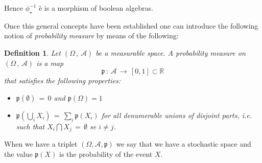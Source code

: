 \documentclass[10pt,a4paper]{article}
\newtheorem{definizione}{Definition}[section]
\begin{document}
Hence $\phi_\star^{-1}$ \`{e} is a morphism of boolean algebras.
\par
Once this general concepts have been established one can introduce the following  notion of
\textit{probability measure} by means of the following:
\begin{definizione}
\label{misaproba} Let $\left(\Omega\, , \, \mathcal{A}\right)$ be a measurable space. A probability measure on $\left(\Omega\,
, \, \mathcal{A}\right)$ is a map
\begin{equation}\label{cuccusprobrpus}
    \mathfrak{p} \, : \, \mathcal{A} \, \rightarrow \, [0,1] \subset \mathbb{R}
\end{equation}
that satisfies the following properties:
\begin{itemize}
  \item $\mathfrak{p}(\emptyset) \, = \, 0$ and $\mathfrak{p}(\Omega)=1$
  \item $\mathfrak{p}\left ( \bigcup_{i} X_i \right)\, = \, \sum_i
  \mathfrak{p}\left(X_i\right)$  for all denumerable unions of disjoint parts, i.e. such that
  $X_i\bigcap X_j \, =\, \emptyset$ se
  $i \neq j$.
\end{itemize}
\end{definizione}
When we have a triplet
$\left(\Omega,\mathcal{A},\mathfrak{p}\right)$ we say that we have
a stochastic  space and the value $\mathfrak{p}(X)$ is the probability of the event $X$.
\end{document}

